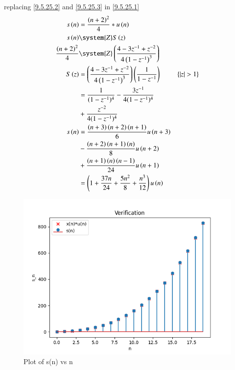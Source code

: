 \documentclass[journal,12pt,twocolumn]{article}
\begin{document}
replacing \eqref{9.5.25.2} and \eqref{9.5.25.3} in \eqref{9.5.25.1}
\begin{align}
    s\brak{n}& = \frac{\brak{n+2}^2}{4} * u\brak{n} \\
    s\brak{n} & \system{Z} S\brak{z} \\
	\frac{\brak{n+2}^2}{4} & \system{Z} \brak{\frac{4 -3z^{-1} + z^{-2}}{4\brak{1-z^{-1}}^3}}\\ 
    S\brak{z} & = \brak{\frac{4 -3z^{-1} + z^{-2}}{4\brak{1-z^{-1}}^3}} \brak{\frac{1}{1-z^{-1}}} & \cbrak{|z|>1}\\
    & = \frac{1}{(1 - z^{-1})^4} - \frac{3z^{-1}}{4(1 - z^{-1})^4}\notag\\
    & + \frac{z^{-2}}{4(1 - z^{-1})^4}\\
    s\brak{n} & = \frac{\brak{n + 3} \brak{n + 2}\brak{n+1}}{6}u\brak{n+3}\notag\\
    & - \frac{\brak{n + 2} \brak{n + 1}\brak{n}}{8}u\brak{n+2}\notag\\
    & + \frac{\brak{n + 1} \brak{n}\brak{n-1}}{24}u\brak{n+1}\\
    & = \brak{1 + \frac{37n}{24} + \frac{5n^2}{8} + \frac{n^3}{12}} u\brak{n} 
\end{align}

\begin{figure}[h]
   \centering
   \includegraphics[width=1\columnwidth]{figs/plot.png}
   \caption{Plot of s(n) vs n}
   \label {fig: 11.9.5.25.1}
\end{figure}
\end{document}
